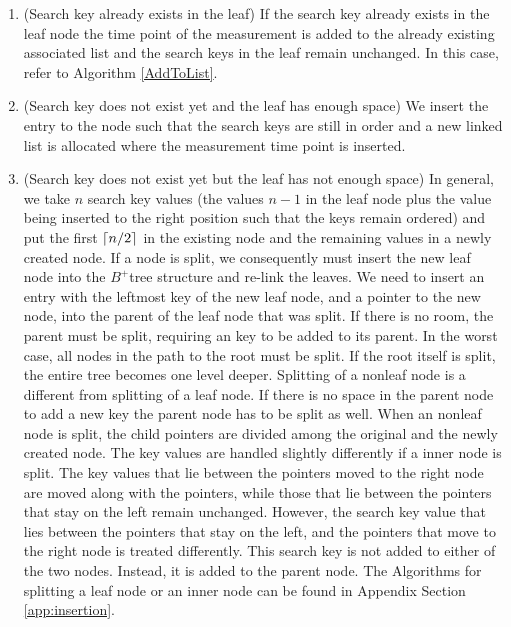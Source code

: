 \documentclass[abstracton,12pt,oneside]{scrreprt}
\DeclarePairedDelimiter\ceil{\lceil}{\rceil}
\begin{document}
\begin{enumerate}
\item (Search key already exists in the leaf) If the search key already exists in the leaf node the time point of the measurement is added to the already existing associated list and the search keys in the leaf remain unchanged. In this case, refer to Algorithm \ref{AddToList}. 
\item (Search key does not exist yet and the leaf has enough space)  We insert the entry to the node such that the search keys are still in order and a new linked list is allocated where the measurement time point is inserted.
\item (Search key does not exist yet but the leaf has not enough space) In general, we take $n$ search key values (the values $n-1$ in the leaf node plus the value being inserted to the right position such that the keys remain ordered) and put the first $\ceil{n/2}$ in the existing node and the remaining values in a newly created node.
If a node is split, we consequently must insert the new leaf node into the $B^+$tree structure and re-link the leaves. We need to insert an entry with the leftmost key of the new leaf node, and a pointer to the new node, into the parent of the leaf node that was split. If there is no room, the parent must be split, requiring an key to be added to its parent. In the worst case, all nodes in the path to the root must be split. If the root itself is split, the entire tree becomes one level deeper. Splitting of a nonleaf node is a different from splitting of a leaf node. If there is no
space in the parent node to add a new key the parent node has to be split as well.
When an nonleaf node is split, the child pointers are divided among
the original and the newly created node. The key values are handled slightly differently if a inner node is split. The key values that lie between the pointers moved to the right node are moved along with the pointers, while
those that lie between the pointers that stay on the left remain unchanged. 
However, the search key value that lies between the pointers that stay on the
left, and the pointers that move to the right node is treated differently. This search key
is not added to either of the two nodes. Instead, it is added to
the parent node. The Algorithms for splitting a leaf node or an inner node can be found in Appendix Section \ref{app:insertion}.\\
\end{enumerate}
\end{document}
